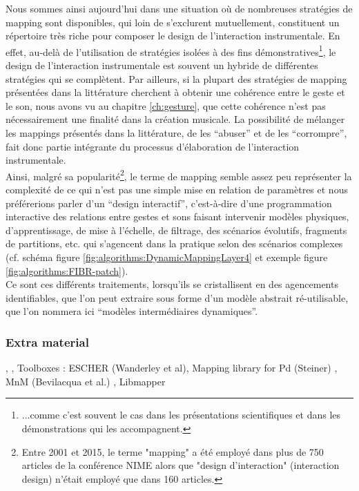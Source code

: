 \noindent Nous sommes ainsi aujourd'hui dans une situation où de nombreuses stratégies de mapping sont disponibles, qui loin de s'exclurent mutuellement, constituent un répertoire très riche pour composer le design de l'interaction instrumentale. En effet, au-delà de l'utilisation de stratégies isolées à des fins démonstratives\footnote{...comme c'est souvent le cas dans les présentations scientifiques et dans les démonstrations qui les accompagnent.}, le design de l'interaction instrumentale est souvent un hybride de différentes stratégies qui se complètent. Par ailleurs, si la plupart des stratégies de mapping présentées dans la littérature cherchent à obtenir une cohérence entre le geste et le son, nous avons vu au chapitre \ref{ch:gesture}, que cette cohérence n'est pas nécessairement une finalité dans la création musicale. La possibilité de mélanger les mappings présentés dans la littérature, de les ``abuser'' et de les ``corrompre'', fait donc partie intégrante du processus d'élaboration de l'interaction instrumentale.\\
\indent Ainsi, malgré sa popularité\footnote{Entre 2001 et 2015, le terme "mapping" a été employé dans plus de 750 articles de la conférence \gls{NIME} alors que "design d'interaction" (interaction design) n'était employé que dans 160 articles.}, le terme de mapping semble assez peu représenter la complexité de ce qui n'est pas une simple mise en relation de paramètres et nous préférerions parler d'un ``design interactif'', c'est-à-dire d'une programmation interactive des relations entre gestes et sons faisant intervenir modèles physiques, d'apprentissage, de mise à l'échelle, de filtrage, des scénarios évolutifs, fragments de partitions, etc. qui s'agencent dans la pratique selon des scénarios complexes (cf. schéma figure \ref{fig:algorithms:DynamicMappingLayer4} et exemple figure \ref{fig:algorithms:FIBR-patch}).\\
\noindent Ce sont ces différents traitements, lorsqu'ils se cristallisent en des agencements identifiables, que l'on peut extraire sous forme d'un modèle abstrait ré-utilisable, que l'on nommera ici ``modèles intermédiaires dynamiques''.

\subsubsection{Extra material}

\cite{momeni_dynamic_2006}, \cite{winkler_making_1995}, 
Toolboxes : ESCHER (Wanderley et al)\cite{wanderley_escher-modeling_1998}, Mapping library for Pd (Steiner) \cite{steiner_towards_2006}, MnM (Bevilacqua et al.) \cite{bevilacqua_mnm_2005}, Libmapper

